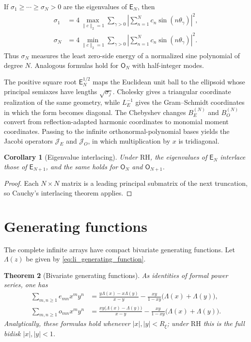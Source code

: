 \documentclass[11pt]{amsart}
\numberwithin{equation}{section}
\theoremstyle{plain}
\newtheorem{theorem}{Theorem}[section]
\newtheorem{corollary}[theorem]{Corollary}
\theoremstyle{definition}
\theoremstyle{remark}
\newcommand{\RH}{\mathrm{RH}}
\newcommand{\E}{\mathsf E}
\newcommand{\Omat}{\mathsf O}
\begin{document}
If $\sigma_1\ge\cdots\ge\sigma_N>0$ are the eigenvalues of $\E_N$, then
\begin{align}
\sigma_1
&=4\max_{\|c\|_2=1}
\sum_{\gamma>0}
\left|\sum_{n=1}^{N}c_n\sin(n\theta_\gamma)\right|^2,
\label{eq:E_largest_eigenvalue_variational}\\
\sigma_N
&=4\min_{\|c\|_2=1}
\sum_{\gamma>0}
\left|\sum_{n=1}^{N}c_n\sin(n\theta_\gamma)\right|^2.
\label{eq:E_smallest_eigenvalue_variational}
\end{align}
Thus $\sigma_N$ measures the least zero-side energy of a normalized sine polynomial of degree $N$. Analogous formulas hold for $\Omat_N$ with half-integer modes.

The positive square root $\E_N^{1/2}$ maps the Euclidean unit ball to the ellipsoid whose principal semiaxes have lengths $\sqrt{\sigma_j}$. Cholesky gives a triangular coordinate realization of the same geometry, while $L_E^{-1}$ gives the Gram--Schmidt coordinates in which the form becomes diagonal. The Chebyshev changes $B_E^{(N)}$ and $B_O^{(N)}$ convert from reflection-adapted harmonic coordinates to monomial moment coordinates. Passing to the infinite orthonormal-polynomial bases yields the Jacobi operators $\mathcal J_E$ and $\mathcal J_O$, in which multiplication by $x$ is tridiagonal.

\begin{corollary}[Eigenvalue interlacing]
\label{cor:eigenvalue_interlacing}
Under $\RH$, the eigenvalues of $\E_N$ interlace those of $\E_{N+1}$, and the same holds for $\Omat_N$ and $\Omat_{N+1}$.
\end{corollary}

\begin{proof}
Each $N\times N$ matrix is a leading principal submatrix of the next truncation, so Cauchy's interlacing theorem applies.
\end{proof}

\section{Generating functions}
\label{sec:generating_functions}

The complete infinite arrays have compact bivariate generating functions. Let $\Lambda(z)$ be given by \eqref{eq:li_generating_function}.
\begin{theorem}[Bivariate generating functions]
\label{thm:bivariate_generating_functions}
As identities of formal power series, one has
\begin{align}
\sum_{m,n\ge1}e_{mn}x^my^n
&=
\frac{y\Lambda(x)-x\Lambda(y)}{x-y}
-
\frac{xy}{1-xy}\bigl(\Lambda(x)+\Lambda(y)\bigr),
\label{eq:E_bivariate_generating_function}\\
\sum_{m,n\ge1}o_{mn}x^my^n
&=
\frac{xy\bigl(\Lambda(x)-\Lambda(y)\bigr)}{x-y}
-
\frac{xy}{1-xy}\bigl(\Lambda(x)+\Lambda(y)\bigr).
\label{eq:O_bivariate_generating_function}
\end{align}
Analytically, these formulas hold whenever $|x|,|y|<R_\xi$; under $\RH$ this is the full bidisk $|x|,|y|<1$.
\end{theorem}
\end{document}
